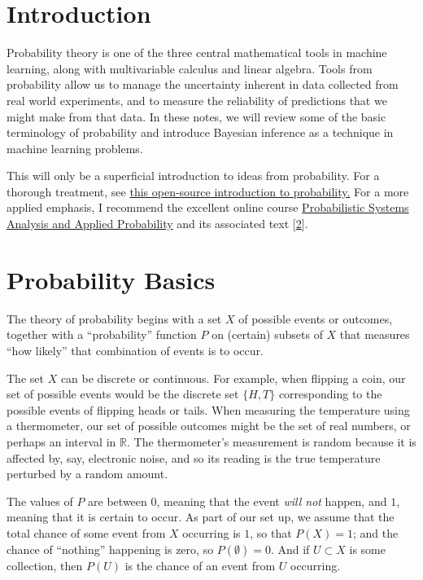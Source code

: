 \documentclass[
  oneside]{scrbook}
\begin{document}
\hypertarget{introduction-1}{%
\section{Introduction}\label{introduction-1}}

Probability theory is one of the three central mathematical tools in
machine learning, along with multivariable calculus and linear algebra.
Tools from probability allow us to manage the uncertainty inherent in
data collected from real world experiments, and to measure the
reliability of predictions that we might make from that data. In these
notes, we will review some of the basic terminology of probability and
introduce Bayesian inference as a technique in machine learning
problems.

This will only be a superficial introduction to ideas from probability.
For a thorough treatment, see
\href{https://probability.oer.math.uconn.edu/3160-oer}{this open-source
introduction to probability.} For a more applied emphasis, I recommend
the excellent online course
\href{https://ocw.mit.edu/courses/electrical-engineering-and-computer-science/6-041-probabilistic-systems-analysis-and-applied-probability-fall-2010/}{Probabilistic
Systems Analysis and Applied Probability} and its associated text
{[}\protect\hyperlink{ref-Bertsekas}{2}{]}.

\hypertarget{probability-basics}{%
\section{Probability Basics}\label{probability-basics}}

The theory of probability begins with a set \(X\) of possible events or
outcomes, together with a ``probability'' function \(P\) on (certain)
subsets of \(X\) that measures ``how likely'' that combination of events
is to occur.

The set \(X\) can be discrete or continuous. For example, when flipping
a coin, our set of possible events would be the discrete set \(\{H,T\}\)
corresponding to the possible events of flipping heads or tails. When
measuring the temperature using a thermometer, our set of possible
outcomes might be the set of real numbers, or perhaps an interval in
\(\mathbb{R}\). The thermometer's measurement is random because it is
affected by, say, electronic noise, and so its reading is the true
temperature perturbed by a random amount.

The values of \(P\) are between \(0\), meaning that the event \emph{will
not} happen, and \(1\), meaning that it is certain to occur. As part of
our set up, we assume that the total chance of some event from \(X\)
occurring is \(1\), so that \(P(X)=1\); and the chance of ``nothing''
happening is zero, so \(P(\emptyset)=0\). And if \(U\subset X\) is some
collection, then \(P(U)\) is the chance of an event from \(U\)
occurring.
\end{document}
